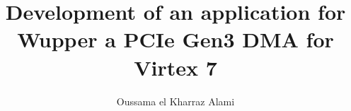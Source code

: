 \author{Oussama el Kharraz Alami}
\title{\large Development of an application for\\ \small Wupper a PCIe Gen3 DMA for Virtex 7 }

\date{\SetDocumentDate}
\def\DocVer{1.0}
\def\SetDocumentDate{29-1-2016}








\begin{appendices}

\end{appendices}


